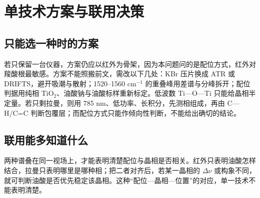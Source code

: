 \section{单技术方案与联用决策}

\subsection{只能选一种时的方案}

若只保留一台仪器，方案仍应以红外为骨架，因为本问题问的是配位方式，红外对羧酸根最敏感。方案不能照搬前文，需改以下几处：KBr 压片换成 ATR 或 DRIFTS，避开吸潮与散射；1520--1560 cm$^{-1}$ 的重叠峰用差谱与分峰拆开；配位判据用纯相 TiO$_2$、油酸钠与油酸标样重新标定。低波数 Ti—O—Ti 只能给晶相半定量\cite{piao2026ir}。若只剩拉曼，则用 785 nm、低功率、长积分，先测相组成，再由 C—H/C=C 判断包覆层；而配位方式只能作倾向性判断，不能给出确切的结论。

\subsection{联用能多知道什么}

两种谱叠在同一视场上，才能表明清楚配位与晶相是否相关。红外只表明油酸怎样结合，拉曼只表明哪里是哪种相；把二者对齐后，若某一晶相的 $\Delta\nu$ 或构象不同，就可判断油酸是否优先稳定该晶相。这种“配位—晶相—位置”的对应，单一技术不能表明清楚\cite{kurouski2020}。
